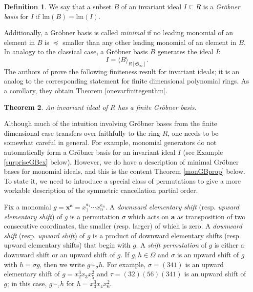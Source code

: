 \documentclass{amsart}
\newtheorem{theorem}{Theorem}[section]
\theoremstyle{definition}
\newtheorem{definition}[theorem]{Definition}
\theoremstyle{remark}
\numberwithin{equation}{section}
\newcommand{\<}{\langle}
\renewcommand{\>}{\rangle}
\begin{document}
\begin{definition}
We say that a subset $B$ of an invariant
ideal $I \subseteq R$ is a \emph{Gr\"obner basis}\/ for $I$
if lm$(B) = \text{lm}(I)$.
\end{definition}

Additionally, a Gr\"obner basis is called \textit{minimal} if
no leading monomial of an element in $B$ is $\preceq$ smaller
than any other leading monomial of an element in $B$.
In analogy to the classical case, a Gr\"obner basis $B$
generates the ideal $I$:
\[ I =  \<B\>_{R[{\mathfrak S}_\infty]}.\]
The authors of \cite{AH} prove the following finiteness
result for invariant ideals; it is an analog to the corresponding
statement for finite dimensional polynomial rings.  As a corollary,
they obtain Theorem \ref{onevarfinitegenthm}.

\begin{theorem}
An invariant ideal of $R$ has a finite Gr\"obner basis.
\end{theorem}

Although much of the intuition involving Gr\"obner bases from the finite dimensional case 
transfers over faithfully to the ring $R$, one needs to be somewhat careful in general.  
For example, monomial generators do not automatically form a Gr\"obner basis for
an invariant ideal $I$ (see Example \ref{surpriseGBex} below).
However, we do have a description of minimal Gr\"obner bases for
monomial ideals, and this is the content Theorem \ref{monGBprop} below.  
To state it, we need to introduce a special class of permutations to give a 
more workable description of the symmetric cancellation partial order.

Fix a monomial $g = \mathbf{x}^{\mathbf{a}} = x_1^{a_1}\cdots x_n^{a_n}$. 
A \textit{downward elementary shift} (resp. \textit{upward elementary shift})
of $g$ is a permutation $\sigma$ which acts
on $\mathbf{a}$ as transposition of two consecutive coordinates, the smaller (resp. larger)
of which is zero.  A \textit{downward shift} (resp. \textit{upward shift})
of $g$ is a product of downward elementary shifts (resp. upward elementary shifts) that begin
with $g$. A \textit{shift permutation} of $g$ is either a downward shift or an upward shift of $g$.
If $g,h \in \Omega$ and $\sigma$ is an upward shift of $g$ with $h = \sigma g$, then we
write $g \sim_{\sigma} h$.  
For example, $\sigma = (341)$ is an upward elementary 
shift of $g =  x_2^3x_3^{\phantom{3}}x_5^2$ and  $\tau = (32)(56)(341)$ is an upward shift of $g$; 
in this case, $g \sim_{\tau} h$ for $h = x_3^3x_4^{\phantom{3}}x_6^2$.
\end{document}
